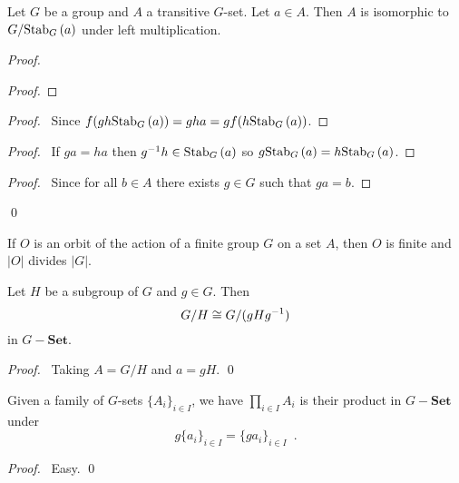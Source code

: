 \begin{prop}
Let $G$ be a group and $A$ a transitive $G$-set. Let $a \in A$. Then $A$ is isomorphic to $G / \mathrm{Stab}_{G} \left( {a} \right)$ under left multiplication.
\end{prop}

\begin{proof}
\pf
{}
\begin{proof}
\end{proof}
\begin{proof}
	\pf\ Since $f(gh \mathrm{Stab}_{G} \left( {a} \right)) = gha = g f(h \mathrm{Stab}_{G} \left( {a} \right))$.
\end{proof}
\begin{proof}
	\pf\ If $ga = ha$ then ${g}^{-1}h \in \mathrm{Stab}_{G} \left( {a} \right)$ so $g \mathrm{Stab}_{G} \left( {a} \right) = h \mathrm{Stab}_{G} \left( {a} \right)$.
\end{proof}
\begin{proof}
	\pf\ Since for all $b \in A$ there exists $g \in G$ such that $ga = b$.
\end{proof}
\qed
\end{proof}

\begin{cor}
If $O$ is an orbit of the action of a finite group $G$ on a set $A$, then $O$ is finite and $|O|$ divides $|G|$.
\end{cor}

\begin{cor}
Let $H$ be a subgroup of $G$ and $g \in G$. Then
\[ G / H \cong G / (g H {g}^{-1}) \]
in $G-\mathbf{Set}$.
\end{cor}

\begin{proof}
\pf\ Taking $A = G / H$ and $a = gH$. \qed
\end{proof}

\begin{prop}
Given a family of $G$-sets $\{ A_i \}_{i \in I}$, we have $\prod_{i \in I} A_i$ is their product in $G-\mathbf{Set}$ under
\[ g \{a_i\}_{i \in I} = \{ga_i\}_{i \in I} \enspace . \]
\end{prop}

\begin{proof}
\pf\ Easy. \qed
\end{proof}

